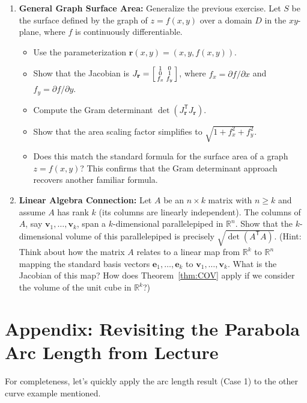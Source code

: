 \documentclass[12pt]{article}
\theoremstyle{definition} %
\theoremstyle{plain} %
\theoremstyle{remark} %
\begin{document}
\begin{enumerate}[label=\arabic*., itemsep=0.5em, leftmargin=*]
    \item \textbf{General Graph Surface Area:} Generalize the previous exercise. Let $S$ be the surface defined by the graph of $z = f(x,y)$ over a domain $D$ in the $xy$-plane, where $f$ is continuously differentiable.
        \begin{itemize}
            \item Use the parameterization $\mathbf{r}(x,y) = (x, y, f(x,y))$.
            \item Show that the Jacobian is $J_{\mathbf{r}} = \begin{bsmallmatrix} 1 & 0 \\ 0 & 1 \\ f_x & f_y \end{bsmallmatrix}$, where $f_x = \partial f/\partial x$ and $f_y = \partial f/\partial y$.
            \item Compute the Gram determinant $\det(J_{\mathbf{r}}^{\mathsf{T}} J_{\mathbf{r}})$.
            \item Show that the area scaling factor simplifies to $\sqrt{1 + f_x^2 + f_y^2}$.
            \item Does this match the standard formula for the surface area of a graph $z=f(x,y)$? This confirms that the Gram determinant approach recovers another familiar formula.
        \end{itemize}

    \item \textbf{Linear Algebra Connection:} Let $A$ be an $n \times k$ matrix with $n \ge k$ and assume $A$ has rank $k$ (its columns are linearly independent). The columns of $A$, say $\mathbf{v}_1, \dots, \mathbf{v}_k$, span a $k$-dimensional parallelepiped in $\mathbb{R}^n$. Show that the $k$-dimensional volume of this parallelepiped is precisely $\sqrt{\det(A^{\mathsf{T}}A)}$. (Hint: Think about how the matrix $A$ relates to a linear map from $\mathbb{R}^k$ to $\mathbb{R}^n$ mapping the standard basis vectors $\mathbf{e}_1, \dots, \mathbf{e}_k$ to $\mathbf{v}_1, \dots, \mathbf{v}_k$. What is the Jacobian of this map? How does Theorem~\ref{thm:COV} apply if we consider the volume of the unit cube in $\mathbb{R}^k$?)
\end{enumerate}

\appendix
\section{Appendix: Revisiting the Parabola Arc Length from Lecture}

For completeness, let's quickly apply the arc length result (Case 1) to the other curve example mentioned.
\end{document}
